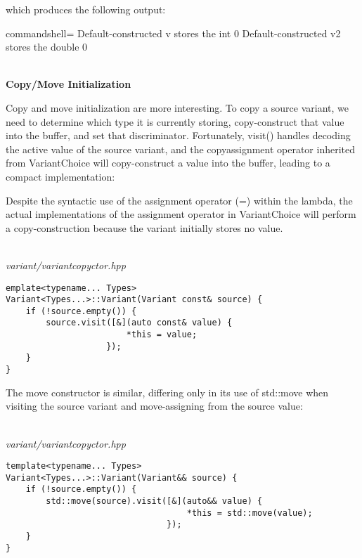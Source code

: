 which produces the following output:

\begin{tcblisting}{commandshell={}}
Default-constructed v stores the int 0
Default-constructed v2 stores the double 0
\end{tcblisting}

\hspace*{\fill} \\ %
\noindent
\textbf{Copy/Move Initialization}

Copy and move initialization are more interesting. To copy a source variant, we need to determine which type it is currently storing, copy-construct that value into the buffer, and set that discriminator. Fortunately, visit() handles decoding the active value of the source variant, and the copyassignment operator inherited from VariantChoice will copy-construct a value into the buffer, leading to a compact implementation:

\begin{tcolorbox}[colback=webgreen!5!white,colframe=webgreen!75!black]
\hspace*{0.75cm}Despite the syntactic use of the assignment operator (=) within the lambda, the actual implementations of the assignment operator in VariantChoice will perform a copy-construction because the variant initially stores no value.
\end{tcolorbox}

\hspace*{\fill} \\ %
\noindent
\textit{variant/variantcopyctor.hpp}
\begin{lstlisting}[style=styleCXX]
emplate<typename... Types>
Variant<Types...>::Variant(Variant const& source) {
	if (!source.empty()) {
		source.visit([&](auto const& value) {
						*this = value;
					});
	}
}
\end{lstlisting}

The move constructor is similar, differing only in its use of std::move when visiting the source variant and move-assigning from the source value:

\hspace*{\fill} \\ %
\noindent
\textit{variant/variantcopyctor.hpp}
\begin{lstlisting}[style=styleCXX]
template<typename... Types>
Variant<Types...>::Variant(Variant&& source) {
	if (!source.empty()) {
		std::move(source).visit([&](auto&& value) {
									*this = std::move(value);
								});
	}
}
\end{lstlisting}

